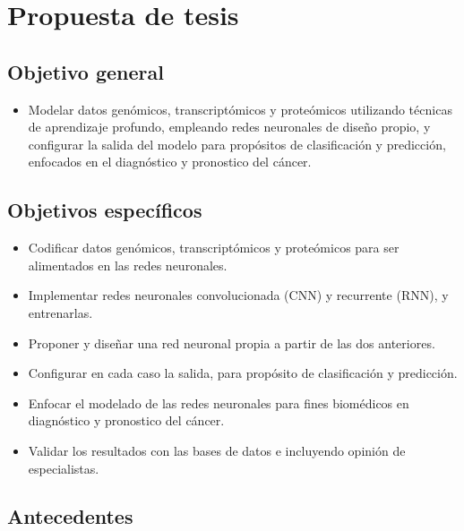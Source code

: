 \section{Propuesta de tesis}

\subsection{Objetivo general}

\begin{itemize}

   \addtolength{\itemsep}{-4mm} %
        \item Modelar datos genómicos, transcriptómicos y proteómicos utilizando técnicas de aprendizaje profundo, empleando redes neuronales de diseño propio, y configurar la salida del modelo para propósitos de clasificación y predicción, enfocados en el diagnóstico y pronostico del cáncer.


    \end{itemize}



\subsection{Objetivos específicos}

\begin{itemize}

   \addtolength{\itemsep}{-4mm} %
        \item Codificar datos genómicos, transcriptómicos y proteómicos para ser alimentados en las redes neuronales.
        \item Implementar redes neuronales convolucionada (CNN) y recurrente (RNN), y entrenarlas.
        \item Proponer y diseñar una red neuronal propia a partir de las dos anteriores.
        \item Configurar en cada caso la salida, para propósito de clasificación y predicción.
        \item Enfocar el modelado de las redes neuronales para fines biomédicos en diagnóstico y pronostico del cáncer.
        \item Validar los resultados con las bases de datos e incluyendo opinión de especialistas.
    \end{itemize}

\subsection{Antecedentes}

